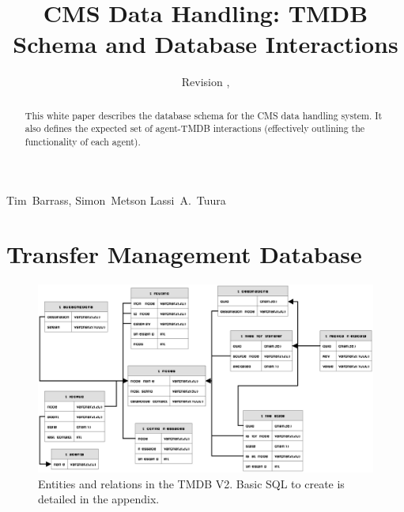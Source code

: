 \documentclass{cmspaper}
\begin{document}
\begin{titlepage}
  \whitepaper
  \date{Revision \RCSRevision, \RCSDate}
  \title{CMS Data Handling: TMDB Schema and Database Interactions}

  \begin{Authlist}
    Tim~Barrass, Simon~Metson
    Lassi~A.~Tuura
  \end{Authlist}

  \begin{abstract}
    This white paper describes the database schema for the CMS data
    handling system. It also defines the expected set of agent-TMDB
    interactions (effectively outlining the functionality of each
    agent).
  \end{abstract}

\end{titlepage}

\setcounter{page}{2}

\section{Transfer Management Database}

\begin{figure}[htbp]
\centering
  \includegraphics[width=15cm]{tmdb-schema.eps}
  \caption{Entities and relations in the TMDB V2.  Basic SQL
    to create is detailed in the appendix.}
   \label{fig:schema}
\end{figure}
\end{document}
